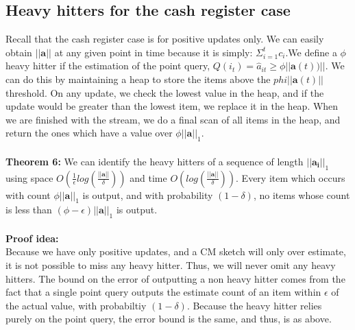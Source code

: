 \documentclass[11pt]{article}
\begin{document}
\subsection{Heavy hitters for the cash register case}
Recall that the cash register case is for positive updates only. We can easily obtain $||\bm{a}||$ at any given point in time because it is simply: $\Sigma_{i=1}^t c_i$.We define a $\phi$ heavy hitter if the estimation of the point query, $Q(i_t) =  \hat a_{it} \geq \phi ||\bm{a}(t))||$. We can do this by maintaining a heap to store the items above the $phi||\bm{a}(t)||$ threshold. On any update, we check the lowest value in the heap, and if the update would be greater than the lowest item, we replace it in the heap. When we are finished with the stream, we do a final scan of all items in the heap, and return the ones which have a value over $\phi||\bm{a}||_1$.\\\\
\textbf{Theorem 6: } We can identify the heavy hitters of a sequence of length $||\bm{a_i}||_1$ using space $O(\frac{1}{\epsilon}log(\frac{||\bm{a}||}{\delta}))$ and time $O(log(\frac{||\bm{a}||}{\delta}))$. Every item which occurs with count $\phi ||\bm{a}||_1$ is output, and with probability $(1-\delta)$, no items whose count is less than $(\phi - \epsilon)||\bm{a}||_1$ is output.\\\\
\textbf{Proof idea:}\\
Because we have only positive updates, and a CM sketch will only over estimate, it is not possible to miss any heavy hitter. Thus, we will never omit any heavy hitters. The bound on the error of outputting a non heavy hitter comes from the fact that a single point query outputs the estimate count of an item within $\epsilon$ of the actual value, with probabiltiy $(1-\delta)$. Because the heavy hitter relies purely on the point query, the error bound is the same, and thus, is as above.\\\\


\end{document}

